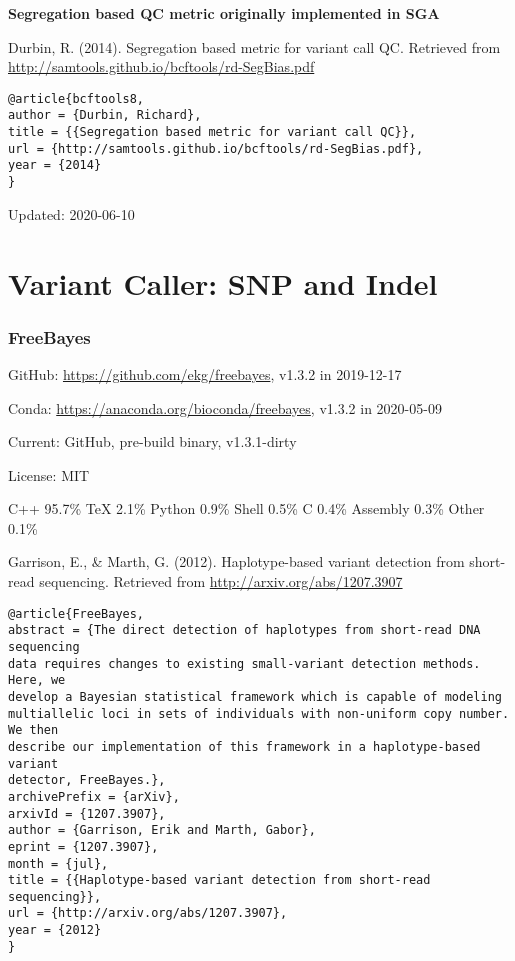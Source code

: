 \documentclass[]{article}
\begin{document}
\textbf{Segregation based QC metric originally implemented in SGA}

Durbin, R. (2014). Segregation based metric for variant call QC. Retrieved from \url{http://samtools.github.io/bcftools/rd-SegBias.pdf}

\begin{verbatim}
@article{bcftools8,
author = {Durbin, Richard},
title = {{Segregation based metric for variant call QC}},
url = {http://samtools.github.io/bcftools/rd-SegBias.pdf},
year = {2014}
}
\end{verbatim}

Updated: 2020-06-10

\part{Variant Caller: SNP and Indel}
\section{FreeBayes}

GitHub: \url{https://github.com/ekg/freebayes}, v1.3.2 in 2019-12-17

Conda: \url{https://anaconda.org/bioconda/freebayes}, v1.3.2 in 2020-05-09

Current: GitHub, pre-build binary, v1.3.1-dirty

License: MIT

C++ 95.7\% TeX 2.1\% Python 0.9\% Shell 0.5\% C 0.4\% Assembly 0.3\% Other 0.1\%

Garrison, E., \& Marth, G. (2012). Haplotype-based variant detection from short-read sequencing. Retrieved from \url{http://arxiv.org/abs/1207.3907}

\begin{verbatim}
@article{FreeBayes,
abstract = {The direct detection of haplotypes from short-read DNA sequencing
data requires changes to existing small-variant detection methods. Here, we
develop a Bayesian statistical framework which is capable of modeling
multiallelic loci in sets of individuals with non-uniform copy number. We then
describe our implementation of this framework in a haplotype-based variant
detector, FreeBayes.},
archivePrefix = {arXiv},
arxivId = {1207.3907},
author = {Garrison, Erik and Marth, Gabor},
eprint = {1207.3907},
month = {jul},
title = {{Haplotype-based variant detection from short-read sequencing}},
url = {http://arxiv.org/abs/1207.3907},
year = {2012}
}
\end{verbatim}
\end{document}
